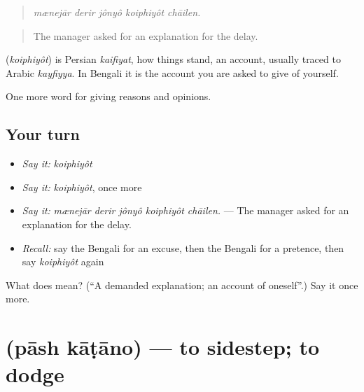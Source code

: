 \begin{quote}
    
\end{quote}

\begin{quote}
\emph{mænejār derir jônyô koiphiyôt chāilen.}
\end{quote}

\begin{quote}
The manager asked for an explanation for the delay.
\end{quote}

\begin{cousinweb}
\textbf{} (\emph{koiphiyôt}) is Persian \emph{kaifiyat}, how things stand, an account, usually traced to Arabic \emph{kayfiyya}. In Bengali it is the account you are asked to give of yourself.
\end{cousinweb}

\begin{grammarlens}[title={What you've built}]
One more word for giving reasons and opinions.
\end{grammarlens}

\subsection*{Your turn}
\begin{itemize}
\raggedright
  \item \emph{Say it:} \emph{koiphiyôt}
  \item \emph{Say it:} \emph{koiphiyôt}, once more
  \item \emph{Say it:} \emph{mænejār derir jônyô koiphiyôt chāilen.} — The manager asked for an explanation for the delay.
  \item \emph{Recall:} say the Bengali for an excuse, then the Bengali for a pretence, then say \emph{koiphiyôt} again
\end{itemize}

\begin{tcolorbox}[breakable,colback=teal!4,colframe=teal!35!black,title={Before you move on}]
What does  mean? (\textquotedblleft{}A demanded explanation; an account of oneself\textquotedblright{}.) Say it once more.
\end{tcolorbox}
\section[\texorpdfstring{\bn{পাশ} \bn{কাটানো} (pāsh kāṭāno)}{পাশ কাটানো (pāsh kāṭāno)}]{  (pāsh kāṭāno) — to sidestep; to dodge}


